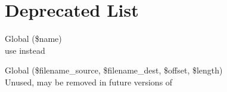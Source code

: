 \chapter{Deprecated List}
\hypertarget{deprecated}{}\label{deprecated}

\begin{DoxyRefList}
\item[Global \doxylink{classget_i_d3__cached__sqlite3_abc8e9e31bb15c8a44c3210ec551407c8}{get\+ID3\+\_\+cached\+\_\+sqlite3\+::\+\_\+\+\_\+get} (\$name)]\hfill \\
\label{deprecated__deprecated000001}%
%
use  instead  
\item[Global \doxylink{classgetid3__lib_a8103f41a3746c5a7d56e6d88b1d34ac9}{getid3\+\_\+lib\+::Copy\+File\+Parts} (\$filename\+\_\+source, \$filename\+\_\+dest, \$offset, \$length)]\hfill \\
\label{deprecated__deprecated000002}%
%
Unused, may be removed in future versions of  
\end{DoxyRefList}